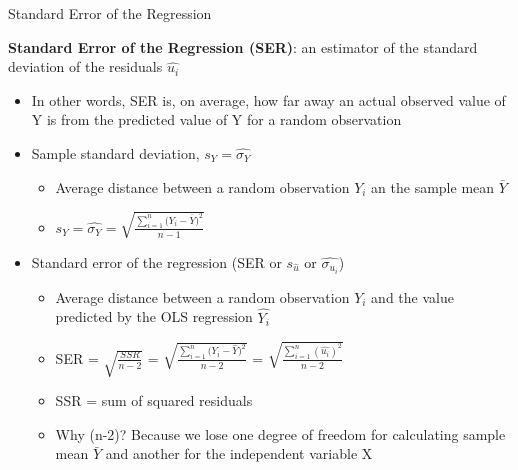 \documentclass[
  8pt,
  ignorenonframetext,
  dvipsnames]{beamer}
\providecommand{\tightlist}{%
  \setlength{\itemsep}{0pt}\setlength{\parskip}{0pt}}
\renewcommand{\textbf}[1]{{\color{darkgray}\bfseries\fontfamily{Montserrat-TOsF}#1}}
\let\olditem\item
\renewcommand{\item}{%
  \olditem\vspace{4pt}
}
\begin{document}
\begin{frame}{Standard Error of the Regression}
\protect\hypertarget{standard-error-of-the-regression}{}

\textbf{Standard Error of the Regression (SER)}: an estimator of the
standard deviation of the residuals \(\hat{u_i}\)

\begin{itemize}
\tightlist
\item
  In other words, SER is, on average, how far away an actual observed
  value of Y is from the predicted value of Y for a random observation
\end{itemize}

\medskip

\begin{itemize}
\tightlist
\item
  Sample standard deviation, \(s_{Y}= \hat{\sigma_{Y}}\)

  \begin{itemize}
  \tightlist
  \item
    Average distance between a random observation \(Y_i\) an the sample
    mean \(\bar{Y}\)
  \item
    \(s_{Y}= \hat{\sigma_{Y}} = \sqrt{ \frac {\sum_{i=1}^{n} ({Y_{i} -\overline{Y})^2}} {n-1} }\)
  \end{itemize}
\end{itemize}

\medskip

\begin{itemize}
\tightlist
\item
  Standard error of the regression (SER or \(s_{\hat{u}}\) or
  \(\hat{\sigma_{u_{i}}}\))

  \begin{itemize}
  \item
    Average distance between a random observation \(Y_i\) and the value
    predicted by the OLS regression \(\hat{Y_i}\)
  \item
    SER = \(\sqrt{\frac{SSR}{n-2}}\) =
    \(\sqrt{ \frac {\sum_{i=1}^{n} ({Y_{i} -\hat{Y})^2}} {n-2} }\) =
    \(\sqrt{ \frac {\sum_{i=1}^{n} (\hat{u_{i}})^2} {n-2} }\)
  \item
    SSR = sum of squared residuals
  \item
    Why (n-2)? Because we lose one degree of freedom for calculating
    sample mean \(\bar{Y}\) and another for the independent variable X
  \end{itemize}
\end{itemize}

\end{frame}
\end{document}
